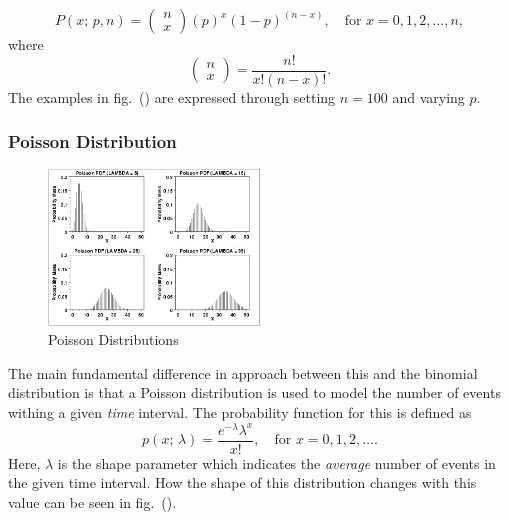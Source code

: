 \documentclass{article}
\begin{document}
\begin{equation}
    P(x;\,p,n) = \begin{pmatrix} n \\ x \end{pmatrix}(p)^x(1-p)^{(n-x)},\quad \text{for }x = 0,1,2,\ldots,n,
\end{equation}
where
\begin{equation}
    \begin{pmatrix} n \\ x \end{pmatrix} = \frac{n!}{x!(n-x)!}.
\end{equation}
The examples in fig.~() are expressed through setting $n=100$ and varying $p$.

\subsubsection{Poisson Distribution}
\begin{figure}[H]
\centering
\includegraphics[width=0.5\textwidth]{images/poisson.jpg}
\caption{Poisson Distributions} \label{fig:pois_dis}
\end{figure}
The main fundamental difference in approach between this and the binomial distribution is that a Poisson distribution is used to model the number of events withing a given \textit{time} interval. The probability function for this is defined as
\begin{equation}
    p(x;\,\lambda) = \frac{e^{-\lambda}\lambda^x}{x!},\quad \text{for }x = 0,1,2,\ldots.
\end{equation}
Here, $\lambda$ is the shape parameter which indicates the \textit{average} number of events in the given time interval. How the shape of this distribution changes with this value can be seen in fig.~().
\end{document}
